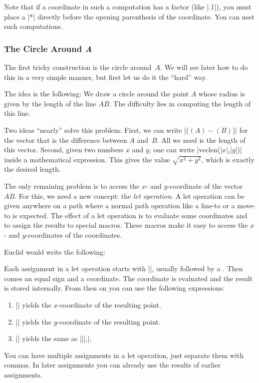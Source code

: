 Note that if a coordinate in such a computation has a factor (like
|.1|), you must place a |*| directly before the opening parenthesis of
the coordinate. You can nest such computations.



\subsubsection{The Circle Around \emph{A}}

The first tricky construction is the circle around~$A$. We will see
later how to do this in a very simple manner, but first let us do it
the ``hard'' way.

The idea is the following: We draw a circle around the point $A$ whose
radius is given by the length of the line $AB$. The difficulty lies in
computing the length of this line.

Two ideas ``nearly'' solve this problem: First, we can write
|($ (A) - (B) $)| for the vector that is the difference between $A$
and~$B$. All we need is the length of this vector. Second, given two
numbers $x$ and $y$, one can write |veclen(|$x$|,|$y$|)| inside a
mathematical expression. This gives the value $\sqrt{x^2+y^2}$, which
is exactly the desired length.

The only remaining problem is to access the $x$- and $y$-coordinate of
the vector~$AB$. For this, we need a new concept: the \emph{let
  operation}. A let operation can be given anywhere on a path where a
normal path operation like a line-to or a move-to is expected. The
effect of a let operation is to evaluate some coordinates and to
assign the results to special macros. These macros make it easy to
access the $x$- and $y$-coordinates of the coordinates.

Euclid would write the following:
\begin{codeexample}[]
\end{codeexample}

Each assignment in a let operation starts with |\p|, usually followed
by a . Then comes an equal sign and a coordinate. The
coordinate is evaluated and the result is stored internally. From
then on you can use the following expressions: 
\begin{enumerate}
\item |\x| yields the $x$-coordinate of the resulting point.
\item |\y| yields the $y$-coordinate of the resulting
  point.
\item |\p| yields the same as |\x||,\y|.
\end{enumerate}
You can have multiple assignments in a let operation, just separate
them with commas. In later assignments you can already use the results
of earlier assignments.


